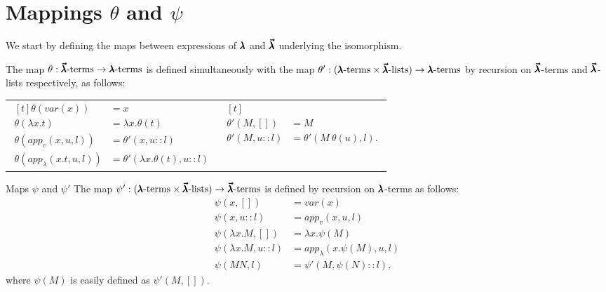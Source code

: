 \section{Mappings $\theta$ and $\psi$}

We start by defining the maps between expressions of $\pmb{\lambda}$ and $\pmb{\vec \lambda}$ underlying the isomorphism.

\begin{definition}
  The map $\theta : \pmb{\vec \lambda} \text{-terms} \to \pmb{\lambda} \text{-terms}$ is defined simultaneously with the map $\theta' : (\pmb{\lambda} \text{-terms} \times \pmb{\vec \lambda} \text{-lists}) \to \pmb{\lambda} \text{-terms}$ by recursion on $\pmb{\vec \lambda}$-terms and $\pmb{\vec \lambda}$-lists respectively, as follows:
  \begin{center}
  \begin{tabular}{cc}
    $ \begin{aligned}[t]
      \theta(var(x)) &= x \\
      \theta(\lambda x . t) &= \lambda x . \theta(t) \\
      \theta(app_v(x, u, l)) &= \theta'(x, u::l) \\
      \theta(app_\lambda (x.t, u, l)) &= \theta'(\lambda x . \theta(t), u::l)
    \end{aligned} $
    & \quad
    $ \begin{aligned}[t] \\
      \theta'(M, [])   &= M \\
      \theta'(M, u::l) &= \theta'(M \ \theta(u), l).
    \end{aligned} $
  \end{tabular}
  \end{center}
\end{definition}
  
\begin{definition}Maps $\psi$ and $\psi'$
  The map $\psi' : (\pmb{\lambda} \text{-terms} \times \pmb{\vec \lambda} \text{-lists}) \to \pmb{\vec \lambda} \text{-terms}$ is defined by recursion on $\pmb{\lambda}$-terms as follows:
  \begin{align*}
    \psi(x, []) &= var(x) \\
    \psi(x, u::l) &= app_v (x, u, l) \\
    \psi(\lambda x . M, []) &= \lambda x . \psi(M) \\
    \psi(\lambda x . M, u::l) &= app_\lambda (x . \psi(M), u, l) \\
    \psi(M N, l) &= \psi'(M, \psi(N)::l),              
  \end{align*}
  where $\psi(M)$ is easily defined as $\psi'(M, [])$.
\end{definition}

